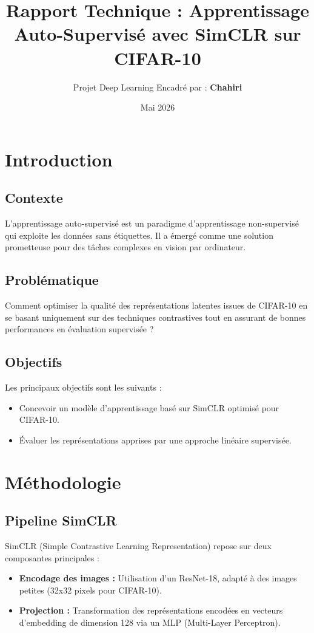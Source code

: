 \documentclass[12pt,a4paper]{article}
\title{Rapport Technique : Apprentissage Auto-Supervisé avec SimCLR sur CIFAR-10}
\author{Projet Deep Learning \newline Encadré par : \textbf{Chahiri}}
\date{Mai 2026}
\begin{document}
\maketitle
\newpage

\tableofcontents
\newpage

\section{Introduction}
\subsection{Contexte}
L’apprentissage auto-supervisé est un paradigme d’apprentissage non-supervisé qui exploite les données sans étiquettes. Il a émergé comme une solution prometteuse pour des tâches complexes en vision par ordinateur.

\subsection{Problématique}
Comment optimiser la qualité des représentations latentes issues de CIFAR-10 en se basant uniquement sur des techniques contrastives tout en assurant de bonnes performances en évaluation supervisée ?

\subsection{Objectifs}
Les principaux objectifs sont les suivants :
\begin{itemize}
    \item Concevoir un modèle d’apprentissage basé sur SimCLR optimisé pour CIFAR-10.
    \item Évaluer les représentations apprises par une approche linéaire supervisée.
\end{itemize}

\newpage

\section{Méthodologie}

\subsection{Pipeline SimCLR}
SimCLR (Simple Contrastive Learning Representation) repose sur deux composantes principales :
\begin{itemize}
    \item \textbf{Encodage des images :} Utilisation d’un ResNet-18, adapté à des images petites (32x32 pixels pour CIFAR-10).
    \item \textbf{Projection :} Transformation des représentations encodées en vecteurs d’embedding de dimension 128 via un MLP (Multi-Layer Perceptron).
\end{itemize}
\end{document}
